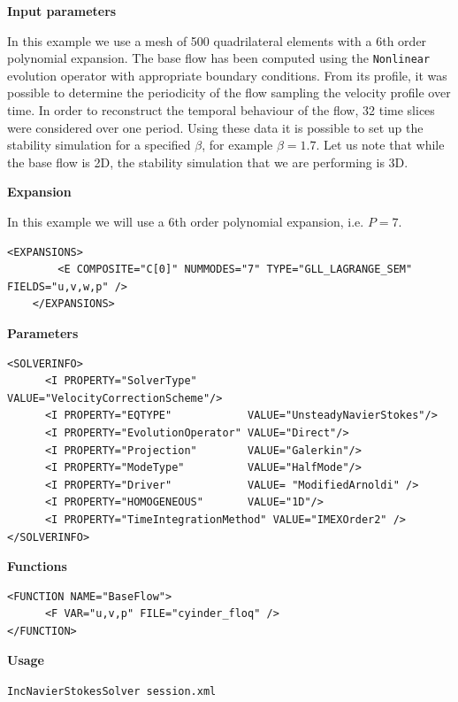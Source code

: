 \textbf{Input parameters}

In this example we use a mesh of 500 quadrilateral elements with a 6th order polynomial expansion. The base flow has been computed using the \texttt{Nonlinear} evolution operator with appropriate boundary conditions. From its profile, it was possible to determine the periodicity of the flow sampling the velocity profile over time. In order to reconstruct the temporal behaviour of the flow, 32 time slices were considered over one period. Using these data it is possible to set up the stability simulation for a specified $\beta$, for example $\beta=1.7$. Let us note that while the base flow is 2D, the stability simulation that we are performing is 3D.

\textbf{Expansion}

In this example we will use a 6th order polynomial expansion, i.e. $P=7$.

 \begin{lstlisting}[style=XMLStyle]  
<EXPANSIONS>
        <E COMPOSITE="C[0]" NUMMODES="7" TYPE="GLL_LAGRANGE_SEM" FIELDS="u,v,w,p" />
    </EXPANSIONS> 
                                            \end{lstlisting}
                                            
                                            
\textbf{Parameters}

 \begin{lstlisting}[style=XMLStyle]  
<SOLVERINFO>
      <I PROPERTY="SolverType"        VALUE="VelocityCorrectionScheme"/>
      <I PROPERTY="EQTYPE"            VALUE="UnsteadyNavierStokes"/>
      <I PROPERTY="EvolutionOperator" VALUE="Direct"/>
      <I PROPERTY="Projection"        VALUE="Galerkin"/>
      <I PROPERTY="ModeType"          VALUE="HalfMode"/>
      <I PROPERTY="Driver"            VALUE= "ModifiedArnoldi" />
      <I PROPERTY="HOMOGENEOUS"       VALUE="1D"/>
      <I PROPERTY="TimeIntegrationMethod" VALUE="IMEXOrder2" />  
</SOLVERINFO>
                                            \end{lstlisting}


\textbf{Functions}

 \begin{lstlisting}[style=XMLStyle]  
<FUNCTION NAME="BaseFlow">
      <F VAR="u,v,p" FILE="cyinder_floq" />
</FUNCTION>
                                            \end{lstlisting}


  \textbf{Usage}
  
\texttt{IncNavierStokesSolver session.xml}

